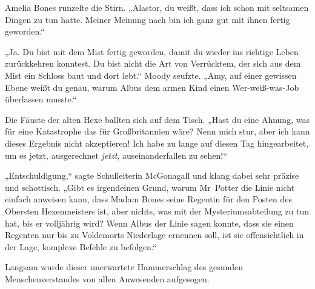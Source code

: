 Amelia Bones runzelte die Stirn.
„Alastor, du weißt, dass ich schon mit seltsamen Dingen zu tun hatte. Meiner Meinung nach bin ich ganz gut mit ihnen fertig geworden.“

„Ja. Du bist mit dem Mist fertig geworden, damit du wieder ins richtige Leben zurückkehren konntest. Du bist nicht die Art von Verrücktem, der sich aus dem Mist ein Schloss baut und dort lebt.“
Moody seufzte.
„Amy, auf einer gewissen Ebene weißt du genau, warum Albus dem armen Kind einen Wer-weiß-was-Job überlassen musste.“

Die Fäuste der alten Hexe ballten sich auf dem Tisch.
„Hast du eine Ahnung, was für eine Katastrophe das für Großbritannien wäre? Nenn mich stur, aber ich kann dieses Ergebnis nicht akzeptieren! Ich habe zu lange auf diesen Tag hingearbeitet, um es jetzt, ausgerechnet \emph{jetzt}, auseinanderfallen zu sehen!“

„Entschuldigung,“ sagte Schulleiterin McGonagall und klang dabei sehr präzise und schottisch. „Gibt es irgendeinen Grund, warum Mr~Potter die Linie nicht einfach anweisen kann, dass Madam Bones seine Regentin für den Posten des Obersten Hexenmeisters ist, aber nichts, was mit der Mysteriumsabteilung zu tun hat, bis er volljährig wird? Wenn Albus der Linie sagen konnte, dass sie einen Regenten nur bis zu Voldemorts Niederlage ernennen soll, ist sie offensichtlich in der Lage, komplexe Befehle zu befolgen.“

Langsam wurde dieser unerwartete Hammerschlag des gesunden Menschenverstandes von allen Anwesenden aufgesogen.

